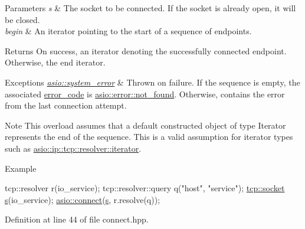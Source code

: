 \begin{DoxyParams}{Parameters}
{\em s} & The socket to be connected. If the socket is already open, it will be closed.\\
\hline
{\em begin} & An iterator pointing to the start of a sequence of endpoints.\\
\hline
\end{DoxyParams}
\begin{DoxyReturn}{Returns}
On success, an iterator denoting the successfully connected endpoint. Otherwise, the end iterator.
\end{DoxyReturn}

\begin{DoxyExceptions}{Exceptions}
{\em \hyperlink{classasio_1_1system__error}{asio\+::system\+\_\+error}} & Thrown on failure. If the sequence is empty, the associated {\ttfamily \hyperlink{classasio_1_1error__code}{error\+\_\+code}} is \hyperlink{namespaceasio_1_1error_ade61a402d1dfb10b1c223906f5ea7847a6cfdfb1e108e927e2bfc847850ba0dcb}{asio\+::error\+::not\+\_\+found}. Otherwise, contains the error from the last connection attempt.\\
\hline
\end{DoxyExceptions}
\begin{DoxyNote}{Note}
This overload assumes that a default constructed object of type {\ttfamily Iterator} represents the end of the sequence. This is a valid assumption for iterator types such as {\ttfamily \hyperlink{classasio_1_1ip_1_1basic__resolver_ad1cc50a31ba4971329a34eb01ef5a21c}{asio\+::ip\+::tcp\+::resolver\+::iterator}}.
\end{DoxyNote}
\begin{DoxyParagraph}{Example}

\begin{DoxyCode}
 tcp::resolver r(io\_service);
tcp::resolver::query q(\textcolor{stringliteral}{"host"}, \textcolor{stringliteral}{"service"});
\hyperlink{namespacewebsocketpp_1_1transport_1_1asio_1_1socket_1_1error_a828ddaa5ed63a761e1b557465a35f05aa0c31b356014843e1d09514e794a539a7}{tcp::socket} \hyperlink{group__async__connect_ga31ab74b9ea6c77932dddd016cfc7920a}{s}(io\_service);
\hyperlink{group__connect_ga29acd61d7a875cef7dbd1f892be2906c}{asio::connect}(\hyperlink{group__async__connect_ga31ab74b9ea6c77932dddd016cfc7920a}{s}, r.resolve(q)); 
\end{DoxyCode}
 
\end{DoxyParagraph}


Definition at line 44 of file connect.\+hpp.


